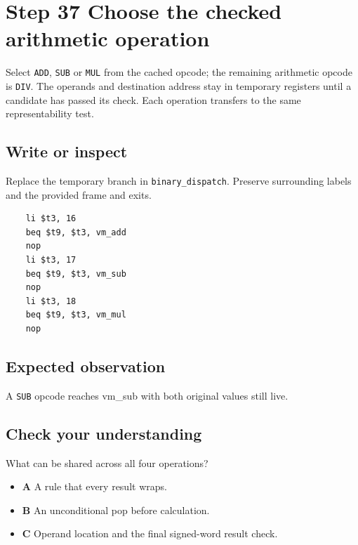\section{Step 37 Choose the checked arithmetic operation}\label{vm-s37}

Select \texttt{ADD}, \texttt{SUB} or \texttt{MUL} from the cached opcode; the remaining arithmetic opcode is \texttt{DIV}. The operands and destination address stay in temporary registers until a candidate has passed its check. Each operation transfers to the same representability test.

\subsection{Write or inspect}
Replace the temporary branch in \texttt{binary\_dispatch}. Preserve surrounding labels and the provided frame and exits.

\begin{verbatim}
    li $t3, 16
    beq $t9, $t3, vm_add
    nop
    li $t3, 17
    beq $t9, $t3, vm_sub
    nop
    li $t3, 18
    beq $t9, $t3, vm_mul
    nop
\end{verbatim}
\subsection{Expected observation}
A \texttt{SUB} opcode reaches vm\_sub with both original values still live.

\subsection{Check your understanding}
What can be shared across all four operations?

\begin{itemize}
  \item \textbf{A} A rule that every result wraps.
  \item \textbf{B} An unconditional pop before calculation.
  \item \textbf{C} Operand location and the final signed-word result check.
\end{itemize}
